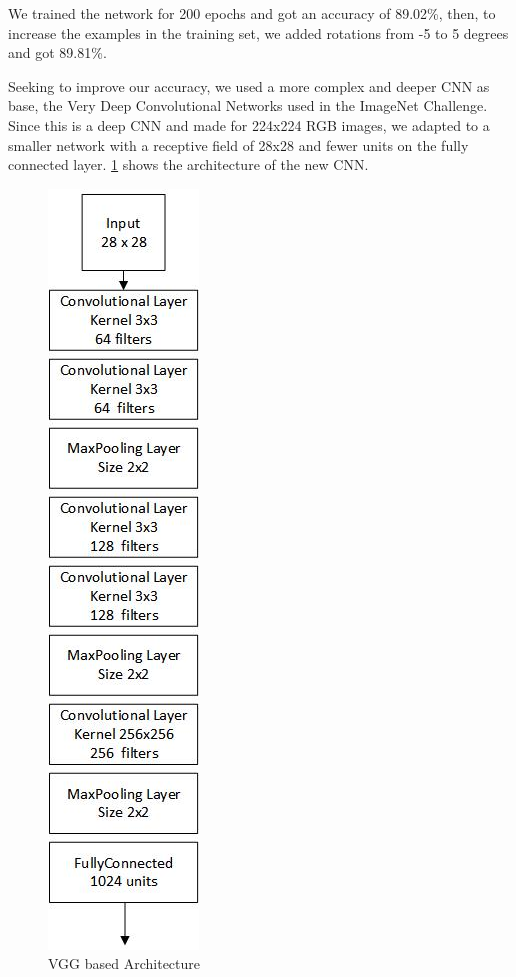 \documentclass[twoside,twocolumn]{article}
\begin{document}
    
    We trained the network for 200 epochs and got an accuracy of 89.02\%, then, to increase the examples in the training set, we added rotations from -5 to 5 degrees and got 89.81\%.
    
    Seeking to improve our accuracy, we used a more complex and deeper CNN as base, the Very Deep Convolutional Networks \cite{DBLP:journals/corr/SimonyanZ14a} used in the  ImageNet Challenge. Since this is a deep CNN and made for 224x224 RGB images, we adapted to a smaller network with a receptive field of 28x28 and fewer units on the fully connected layer. \ref{fig:vgg} shows the architecture of the new CNN.
    
    \begin{figure}[h]
    \begin{center}
        \includegraphics[scale=0.65]{vggArch.jpg}
        \caption{VGG based Architecture\label{fig:vgg}}
    \end{center}
    \end{figure}
    
\end{document}
